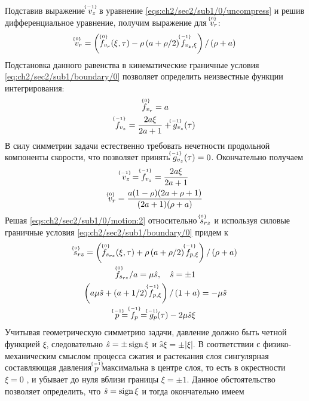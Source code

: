 Подставив выражение $\uindex{v}{-1}_{z}$ в уравнение \cref{eqs:ch2/sec2/sub1/0/uncompress} и решив дифференциальное уравнение, получим выражение для $\uindex{v}{0}_{r}$:
\begin{equation*}
  \uindex{v}{0}_{r} = \left(\uindex{f}{0}_{v_{r}}(\xi, \tau) -\rho \left(a+\rho/2\right) \uindex{f}{-1}_{v_{z},\xi}\right) / \left(\rho+a\right)
\end{equation*}
Подстановка данного равенства в кинематические граничные условия \cref{eq:ch2/sec2/sub1/boundary/0} позволяет определить неизвестные функции интегрирования:
\begin{gather*}
  \uindex{f}{0}_{v_{r}} = a\\
  \uindex{f}{-1}_{v_{z}} = \frac{2a\xi}{2a+1} + \uindex{g}{-1}_{v_{z}}(\tau)
\end{gather*}
В силу симметрии задачи естественно требовать нечетности продольной компоненты скорости, что позволяет принять $\uindex{g}{-1}_{v_{z}}(\tau) = 0$. Окончательно получаем
\begin{gather}
  \label{sol:ch2/sec2/sub1/vz/-1}
  \uindex{v}{-1}_{z} = \uindex{f}{-1}_{v_{z}} = \frac{2a\xi}{2a+1}
  \\
  \label{sol:ch2/sec2/sub1/vr/0}
  \uindex{v}{0}_{r} =  \frac{a(1-\rho)(2a+\rho+1)}{(2a+1)(\rho+a)}
\end{gather}
Решая \cref{eqs:ch2/sec2/sub1/0/motion:2} относительно $\uindex{s}{0}_{rz}$ и используя силовые граничные условия \cref{eq:ch2/sec2/sub1/boundary/0} придем к
\begin{gather*}
  \uindex{s}{0}_{rz} = \left(\uindex{f}{0}_{s_{rz}}(\xi, \tau) + \rho \left(a+\rho/2\right) \uindex{f}{-1}_{p,\xi}\right) / \left(\rho+a\right)
  \\
  \uindex{f}{0}_{s_{rz}} / a = \mu\hat{s}, \quad \hat{s} = \pm 1
  \\
  \left(a \mu\hat{s} + \left(a+1/2\right) \uindex{f}{-1}_{p,\xi}\right) / \left(1+a\right) = -\mu \hat{s}
  \\
  \uindex{p}{-1}=\uindex{f}{-1}_{p} =\uindex{g}{-1}_{p}(\tau) -2\mu\hat{s}\xi
\end{gather*}
Учитывая геометрическую симметрию задачи, давление должно быть четной функцией $\xi$, следовательно $\hat{s} = \pm\sign\xi$ и $\hat{s}\xi = \pm\lvert\xi\rvert$. В соответствии с физико-механическим смыслом процесса сжатия и растекания слоя сингулярная составляющая давления $\uindex{p}{-1}$ максимальна в центре слоя, то есть в окрестности $\xi = 0$ , и убывает до нуля вблизи границы $\xi=\pm1$. Данное обстоятельство позволяет определить, что $\hat{s} = \sign\xi$ и тогда окончательно имеем
